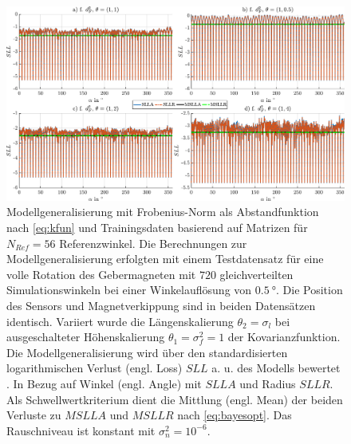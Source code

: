 \clearpage
\begin{landscape}
\begin{figure}[tbph]
\centering
\includegraphics[width=.8\linewidth]{chapters/images/4-EuOExp/Vergleich-QFC-SLL}
\caption[Modellgeneralisierung mit Frobenius-Norm als Abstandfunktion]{Modellgeneralisierung mit Frobenius-Norm als Abstandfunktion nach \autoref{eq:kfun} und Trainingsdaten basierend auf Matrizen für $N_{Ref} = 56$ Referenzwinkel. Die Berechnungen zur Modellgeneralisierung erfolgten mit einem Testdatensatz für eine volle Rotation des Gebermagneten mit $720$ gleichverteilten Simulationswinkeln bei einer Winkelauflösung von $\SI{0,5}{\degree}$. Die Position des Sensors und Magnetverkippung sind in beiden Datensätzen identisch. Variiert wurde die Längenskalierung $\theta_2 = \sigma_l$ bei ausgeschalteter Höhenskalierung $\theta_1 = \sigma_f^2 = 1$ der Kovarianzfunktion. Die Modellgeneralisierung wird über den standardisierten logarithmischen Verlust (engl. Loss) $SLL$ a. u. des Modells bewertet \cite{Rasmussen2006}. In Bezug auf Winkel (engl. Angle) mit $SLLA$ und Radius $SLLR$. Als Schwellwertkriterium dient die Mittlung (engl. Mean) der beiden Verluste zu $MSLLA$ und $MSLLR$ nach \autoref{eq:bayesopt}. Das Rauschniveau ist konstant mit $\sigma_n^2 = 10^{-6}$.}
\label{fig:vergleich-qfc-sll}
\end{figure}
\end{landscape}


